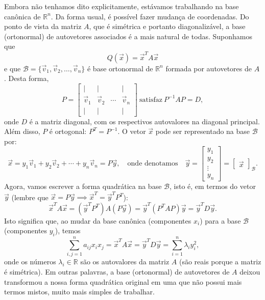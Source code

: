 Embora não tenhamos dito explicitamente, estávamos trabalhando na base canônica de $\mathbb{R}^n$. Da forma usual, é possível fazer mudança de coordenadas. Do ponto de vista da matriz $A$, que é simétrica e portanto diagonalizável, a base (ortonormal) de autovetores associados é a mais natural de todas. Suponhamos que
\begin{equation}
Q(\vec{x}) = \vec{x}^T A \vec{x}
\end{equation} e que $\mathcal{B} = \{ \vec{v}_1, \vec{v}_2, \dots, \vec{v}_n\}$ é base ortonormal de $\mathbb{R}^n$ formada por autovetores de $A$. Desta forma,
\begin{equation}
P =
\begin{bmatrix}
| & | &   & |  \\
\vec{v}_1 & \vec{v}_2 & \cdots & \vec{v}_n \\
| & | &   & |
\end{bmatrix} \ \text{satisfaz} \ P^{-1}AP = D,
\end{equation} onde $D$ é a matriz diagonal, com os respectivos autovalores na diagonal principal. Além disso, $P$ é ortogonal: $P^T = P^{-1}$. O vetor $\vec{x}$ pode ser representado na base $\mathcal{B}$ por:
\begin{equation}
\vec{x} = y_1 \vec{v}_1 + y_2 \vec{v}_2 + \cdots + y_n \vec{v}_n = P\vec{y}, \quad \text{onde denotamos} \quad \vec{y} =
\begin{bmatrix}
y_1 \\ y_2 \\ \vdots \\ y_n
\end{bmatrix} =
\begin{bmatrix}
\vec{x}
\end{bmatrix}_{\mathcal{B}}.
\end{equation} Agora, vamos escrever a forma quadrática na base $\mathcal{B}$, isto é, em termos do vetor $\vec{y}$ (lembre que $\vec{x} = P \vec{y} \implies \vec{x}^T = \vec{y}^T P^T$):
\begin{equation}
\vec{x}^T A \vec{x} = (\vec{y}^T P^T) A (P \vec{y}) = \vec{y}^T (P^T A P) \vec{y} = \vec{y}^T D \vec{y}.
\end{equation} Isto significa que, ao mudar da base canônica (componentes $x_i$) para a base $\mathcal{B}$ (componentes $y_i$), temos
\begin{equation}
\sum_{i,j=1}^{n} a_{ij} x_i x_j = \vec{x}^T A \vec{x} = \vec{y}^T D \vec{y} = \sum_{i=1}^{n} \lambda_i y_i^2,
\end{equation} onde os números $\lambda_i \in \mathbb{R}$ são os autovalores da matriz $A$ (são reais porque a matriz é simétrica). Em outras palavras, a base (ortonormal) de autovetores de $A$ deixou transformou a nossa forma quadrática original em uma que não possui mais termos mistos, muito mais simples de trabalhar.


